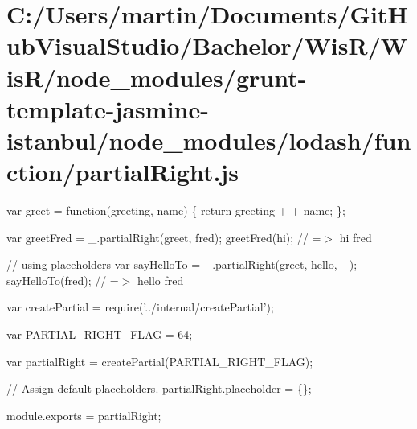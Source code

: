 \hypertarget{_c_1_2_users_2martin_2_documents_2_git_hub_visual_studio_2_bachelor_2_wis_r_2_wis_r_2node_modulef200bd8a802bf219aacfe08f4e1bb672}{}\section{C\+:/\+Users/martin/\+Documents/\+Git\+Hub\+Visual\+Studio/\+Bachelor/\+Wis\+R/\+Wis\+R/node\+\_\+modules/grunt-\/template-\/jasmine-\/istanbul/node\+\_\+modules/lodash/function/partial\+Right.\+js}
var greet = function(greeting, name) \{ return greeting + \textquotesingle{} \textquotesingle{} + name; \};

var greet\+Fred = \+\_\+.\+partial\+Right(greet, \textquotesingle{}fred\textquotesingle{}); greet\+Fred(\textquotesingle{}hi\textquotesingle{}); // =$>$ \textquotesingle{}hi fred\textquotesingle{}

// using placeholders var say\+Hello\+To = \+\_\+.\+partial\+Right(greet, \textquotesingle{}hello\textquotesingle{}, \+\_\+); say\+Hello\+To(\textquotesingle{}fred\textquotesingle{}); // =$>$ \textquotesingle{}hello fred\textquotesingle{}


\begin{DoxyCodeInclude}
var createPartial = require(\textcolor{stringliteral}{'../internal/createPartial'});

var PARTIAL\_RIGHT\_FLAG = 64;

var partialRight = createPartial(PARTIAL\_RIGHT\_FLAG);

\textcolor{comment}{// Assign default placeholders.}
partialRight.placeholder = \{\};

module.exports = partialRight;
\end{DoxyCodeInclude}
 